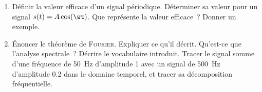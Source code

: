 \documentclass[a4paper, 12pt, final, garamond]{book}
\begin{document}
\begin{enumerate}[resume]
	\item Définir la valeur efficace d'un signal périodique. Déterminer sa valeur
	      pour un signal $s(t) = A \cos(\wt)$. Que représente la valeur efficace~?
	      Donner un exemple.
	\item Énoncer le théorème de \textsc{Fourier}. Expliquer ce qu'il décrit.
	      Qu'est-ce que l'analyse spectrale~? Décrire le vocabulaire introduit. Tracer
	      le signal somme d'une fréquence de \SI{50}{Hz} d'amplitude 1 avec un signal
	      de \SI{500}{Hz} d'amplitude \num{0.2} dans le domaine temporel, et tracer sa
	      décomposition fréquentielle.
\end{enumerate}
\end{document}
